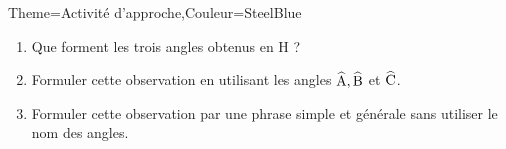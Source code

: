 \begin{Maquette}[Cours]{Theme={Activité d'approche},Couleur={SteelBlue}}
\begin{AActivite}
            \begin{enumerate}[resume]
               \item Que forment les trois angles obtenus en H ? \par
                  \pointilles
               \item Formuler cette observation en utilisant les angles $\widehat{\text A}, \widehat{\text B}$ et $\widehat{\text C}$. \par
                  \pointilles
               \item Formuler cette observation par une phrase simple et générale sans utiliser le nom des angles. \par
                  \pointilles \par
                  \pointilles
            \end{enumerate}

      \end{AActivite}

\end{Maquette}


